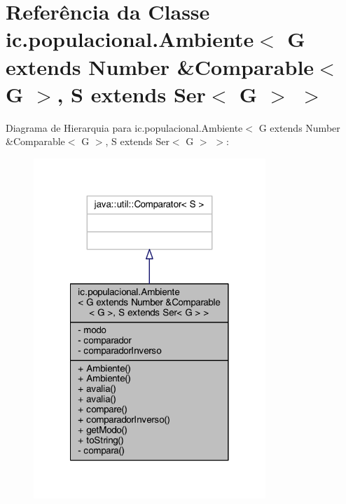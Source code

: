 \hypertarget{classic_1_1populacional_1_1_ambiente_3_01_g_01extends_01_number_01_6_comparable_3_01_g_01_4_00_01a5eb548f12ccc7dbff4cf5c498ddc51}{\section{Referência da Classe ic.\-populacional.\-Ambiente$<$ G extends Number \&Comparable$<$ G $>$, S extends Ser$<$ G $>$ $>$}
\label{classic_1_1populacional_1_1_ambiente_3_01_g_01extends_01_number_01_6_comparable_3_01_g_01_4_00_01a5eb548f12ccc7dbff4cf5c498ddc51}
}


Diagrama de Hierarquia para ic.\-populacional.\-Ambiente$<$ G extends Number \&Comparable$<$ G $>$, S extends Ser$<$ G $>$ $>$\-:
\nopagebreak
\begin{figure}[H]
\begin{center}
\leavevmode
\includegraphics[width=248pt]{classic_1_1populacional_1_1_ambiente_3_01_g_01extends_01_number_01_6_comparable_3_01_g_01_4_00_0ebf80ca98eaa190106331a45750498ba}
\end{center}
\end{figure}


